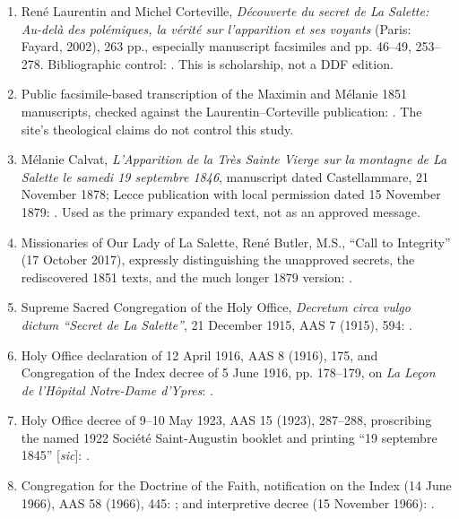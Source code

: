 \begin{enumerate}
  \item René Laurentin and Michel Corteville, \emph{Découverte du secret de La Salette: Au-delà des polémiques, la vérité sur l'apparition et ses voyants} (Paris: Fayard, 2002), 263 pp., especially manuscript facsimiles and pp. 46--49, 253--278. Bibliographic control: . This is scholarship, not a DDF edition.
  \item Public facsimile-based transcription of the Maximin and Mélanie 1851 manuscripts, checked against the Laurentin--Corteville publication: . The site's theological claims do not control this study.
  \item Mélanie Calvat, \emph{L'Apparition de la Très Sainte Vierge sur la montagne de La Salette le samedi 19 septembre 1846}, manuscript dated Castellammare, 21 November 1878; Lecce publication with local permission dated 15 November 1879: . Used as the primary expanded text, not as an approved message.
  \item Missionaries of Our Lady of La Salette, René Butler, M.S., ``Call to Integrity'' (17 October 2017), expressly distinguishing the unapproved secrets, the rediscovered 1851 texts, and the much longer 1879 version: .
  \item Supreme Sacred Congregation of the Holy Office, \emph{Decretum circa vulgo dictum ``Secret de La Salette''}, 21 December 1915, AAS 7 (1915), 594: .
  \item Holy Office declaration of 12 April 1916, AAS 8 (1916), 175, and Congregation of the Index decree of 5 June 1916, pp. 178--179, on \emph{La Leçon de l'Hôpital Notre-Dame d'Ypres}: .
  \item Holy Office decree of 9--10 May 1923, AAS 15 (1923), 287--288, proscribing the named 1922 Société Saint-Augustin booklet and printing ``19 septembre 1845'' [\emph{sic}]: .
  \item Congregation for the Doctrine of the Faith, notification on the Index (14 June 1966), AAS 58 (1966), 445: ; and interpretive decree (15 November 1966): .
\end{enumerate}

